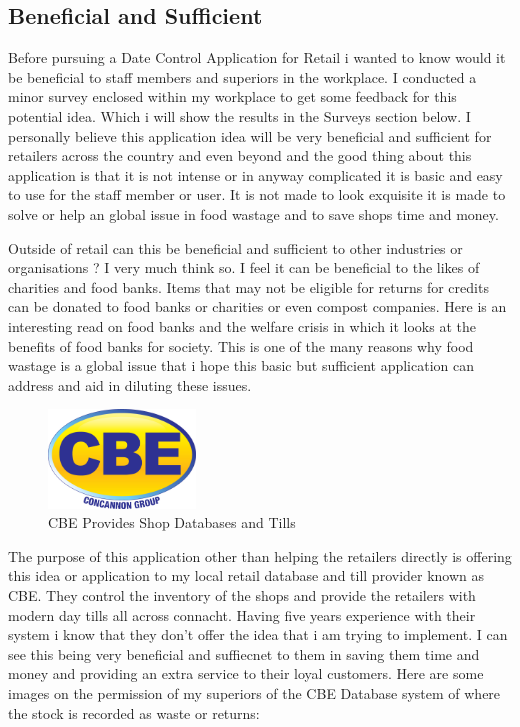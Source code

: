 \subsection{Beneficial and Sufficient}
Before pursuing a Date Control Application for Retail i wanted to know would it be beneficial to staff members and superiors in the workplace. I conducted a minor survey enclosed within my workplace to get some feedback for this potential idea. Which i will show the results in the Surveys section below. I personally believe this application idea will be very beneficial and sufficient for retailers across the country and even beyond and the good thing about this application is that it is not intense or in anyway complicated it is basic and easy to use for the staff member or user. It is not made to look exquisite it is made to solve or help an global issue in food wastage and to save shops time and money.
\newline

Outside of retail can this be beneficial and sufficient to other industries or organisations ? I very much think so. I feel it can be beneficial to the likes of charities and food banks. Items that may not be eligible for returns for credits can be donated to food banks or charities or even compost companies. \cite{riches1986food} Here is an interesting read on food banks and the welfare crisis in which it looks at the benefits of food banks for society. This is one of the many reasons why food wastage is a global issue that i hope this basic but sufficient application can address and aid in diluting these issues. 
\newline

\begin{figure}[h!]
	\caption{CBE Provides Shop Databases and Tills}
	\label{image:cbe}
	\centering
	\includegraphics[width=0.35\textwidth]{images/cbe.jpg}
\end{figure}

The purpose of this application other than helping the retailers directly is offering this idea or application to my local retail database and till provider known as CBE. They control the inventory of the shops and provide the retailers with modern day tills all across connacht. Having five years experience with their system i know that they don't offer the idea that i am trying to implement. I can see this being very beneficial and suffiecnet to them in saving them time and money and providing an extra service to their loyal customers. \newline
Here are some images on the permission of my superiors of the CBE Database system of where the stock is recorded as waste or returns:

